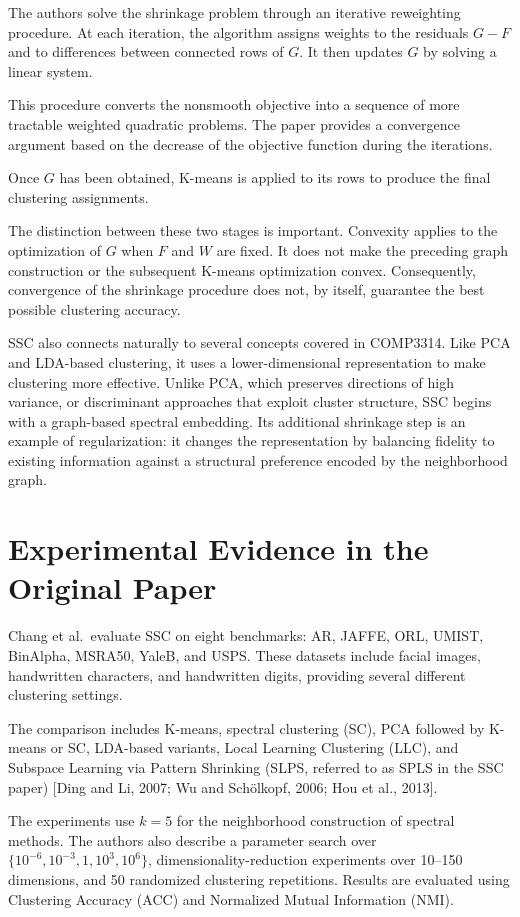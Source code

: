 \documentclass{article}
\begin{document}
The authors solve the shrinkage problem through an iterative reweighting procedure. At each iteration, the algorithm assigns weights to the residuals \(G-F\) and to differences between connected rows of \(G\). It then updates \(G\) by solving a linear system.

This procedure converts the nonsmooth objective into a sequence of more tractable weighted quadratic problems. The paper provides a convergence argument based on the decrease of the objective function during the iterations.

Once \(G\) has been obtained, K-means is applied to its rows to produce the final clustering assignments.

The distinction between these two stages is important. Convexity applies to the optimization of \(G\) when \(F\) and \(W\) are fixed. It does not make the preceding graph construction or the subsequent K-means optimization convex. Consequently, convergence of the shrinkage procedure does not, by itself, guarantee the best possible clustering accuracy.

SSC also connects naturally to several concepts covered in COMP3314. Like PCA and LDA-based clustering, it uses a lower-dimensional representation to make clustering more effective. Unlike PCA, which preserves directions of high variance, or discriminant approaches that exploit cluster structure, SSC begins with a graph-based spectral embedding. Its additional shrinkage step is an example of regularization: it changes the representation by balancing fidelity to existing information against a structural preference encoded by the neighborhood graph.

\section{Experimental Evidence in the Original Paper}

Chang et al.\ evaluate SSC on eight benchmarks: AR, JAFFE, ORL, UMIST, BinAlpha, MSRA50, YaleB, and USPS. These datasets include facial images, handwritten characters, and handwritten digits, providing several different clustering settings.

The comparison includes K-means, spectral clustering (SC), PCA followed by K-means or SC, LDA-based variants, Local Learning Clustering (LLC), and Subspace Learning via Pattern Shrinking (SLPS, referred to as SPLS in the SSC paper) [Ding and Li, 2007; Wu and Schölkopf, 2006; Hou et al., 2013].

The experiments use \(k=5\) for the neighborhood construction of spectral methods. The authors also describe a parameter search over \(\{10^{-6},10^{-3},1,10^3,10^6\}\), dimensionality-reduction experiments over 10--150 dimensions, and 50 randomized clustering repetitions. Results are evaluated using Clustering Accuracy (ACC) and Normalized Mutual Information (NMI).
\end{document}
